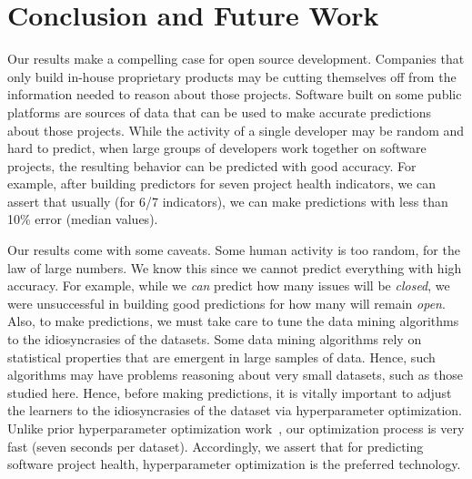 \documentclass[sigconf,review,anonymous]{acmart}
\begin{document}
\section{Conclusion and Future Work}
\label{sect:concl}

 

Our results make a compelling case for open source development. Companies that only build in-house proprietary products may be cutting themselves off from the information needed to reason about those projects. Software built on some public platforms are sources
of data that can be used to
make accurate predictions  about those projects. While the activity of a single developer may be random and hard to predict, when large groups of developers work together on software projects,
the resulting behavior can be predicted with good accuracy. For example, after building predictors for seven project health indicators, we can assert that usually (for 6/7 indicators), we can make predictions with less than 10\% error (median values). 

Our results come with some caveats. Some human activity is  too random, for the law of large numbers. We know this since we cannot predict everything  
 with high accuracy. For example, 
 while we {\em can}  predict how many issues will be {\em closed}, we were   unsuccessful in building good predictions for     how many  will remain {\em open}. 
 Also, to make predictions, we must take care to tune the data mining algorithms to the idiosyncrasies of the datasets.
 Some data mining algorithms rely on statistical properties that are emergent in large samples of data.
 Hence, such algorithms may have problems reasoning about very small datasets, such as those studied here.
 Hence, before making predictions, it is vitally   important to adjust the learners to the idiosyncrasies of the dataset via hyperparameter optimization. Unlike prior hyperparameter optimization work~\cite{Fu2016TuningFS}, our optimization process is very fast (seven seconds per dataset). Accordingly, we assert that for predicting software project health, hyperparameter optimization is the preferred technology.
 
\end{document}
